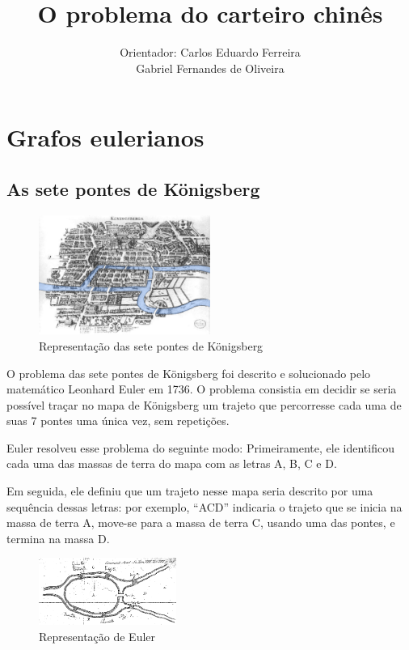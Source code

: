 \documentclass[12pt, a4paper]{article}
\title{O problema do carteiro chinês}
\author{Orientador: Carlos Eduardo Ferreira\\Gabriel Fernandes de Oliveira}
\date{}
\begin{document}
\maketitle


\newpage
\tableofcontents
\newpage


\section{Grafos eulerianos}

\subsection{As sete pontes de Königsberg}

\begin{figure} 
    \centering
    \includegraphics[width=0.5\textwidth]{konigsberg.png}
    \caption{Representação das sete pontes de Königsberg}
\end{figure}

O pro\-blema das sete pontes de Kö\-nigsberg foi des\-crito e solucio\-nado pelo matemático Leonhard Eu\-ler em 1736. 
O problema consistia em decidir se seria possível traçar no mapa de Königsberg um trajeto que percorresse cada uma de suas 7 pon\-tes uma única vez, sem repetições.

Euler resolveu esse problema do seguinte modo: 
Primeiramente, ele identificou cada uma das massas de terra do mapa com as letras A, B, C e D.

Em seguida, ele definiu que um trajeto nesse mapa seria descrito por uma sequência dessas letras: por exemplo, ``ACD'' indicaria o trajeto que se inicia na massa de terra A, move-se para a massa de terra C, usando uma das pontes, e termina na massa D.

\begin{figure} 
    \centering
    \includegraphics[width=0.4\textwidth]{konigsberg-euler.png}
    \caption{Representação de Euler}
	\label{konigsberg-euler}
\end{figure}
\end{document}
